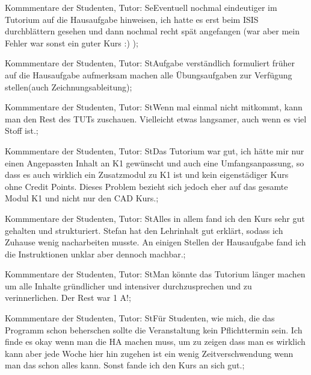 \documentclass[10pt]{beamer}
\begin{document}
\begin{frame}[fragile]{Kommmentare der Studenten, Tutor: Se}Eventuell nochmal eindeutiger im Tutorium auf die Hausaufgabe hinweisen, ich hatte es erst beim ISIS durchblättern gesehen und dann nochmal recht spät angefangen (war aber mein Fehler   war sonst ein guter Kurs :) );
 \end{frame}
\begin{frame}[fragile]{Kommmentare der Studenten, Tutor: St}Aufgabe verständlich formuliert
 früher auf die Hausaufgabe aufmerksam machen
 alle Übungsaufgaben zur Verfügung stellen(auch Zeichnungsableitung);
 \end{frame}
\begin{frame}[fragile]{Kommmentare der Studenten, Tutor: St}Wenn mal einmal nicht mitkommt, kann man den Rest des TUTs zuschauen. Vielleicht etwas langsamer, auch wenn es viel Stoff ist.;
 \end{frame}
\begin{frame}[fragile]{Kommmentare der Studenten, Tutor: St}Das Tutorium war gut, ich hätte mir nur einen Angepassten Inhalt an K1 gewünscht und auch eine Umfangsanpassung, so dass es auch wirklich ein Zusatzmodul zu K1 ist und kein eigenstädiger Kurs ohne Credit Points. Dieses Problem bezieht sich jedoch eher auf das gesamte Modul K1 und nicht nur den CAD Kurs.;
 \end{frame}
\begin{frame}[fragile]{Kommmentare der Studenten, Tutor: St}Alles in allem fand ich den Kurs sehr gut gehalten und strukturiert. Stefan hat den Lehrinhalt gut erklärt, sodass ich Zuhause wenig nacharbeiten musste. 
 An einigen Stellen der Hausaufgabe fand ich die Instruktionen unklar aber dennoch machbar.;
 \end{frame}
\begin{frame}[fragile]{Kommmentare der Studenten, Tutor: St}Man könnte das Tutorium länger machen um alle Inhalte gründlicher und intensiver durchzusprechen und zu verinnerlichen. Der Rest war 1 A!;
 \end{frame}
\begin{frame}[fragile]{Kommmentare der Studenten, Tutor: St}Für Studenten, wie mich, die das Programm schon beherschen sollte die Veranstaltung kein Pflichttermin sein. Ich finde es okay wenn man die HA machen muss, um zu zeigen dass man es wirklich kann aber jede Woche hier hin zugehen ist ein wenig Zeitverschwendung wenn man das schon alles kann. Sonst fande ich den Kurs an sich gut.;
 \end{frame}
\end{document}

